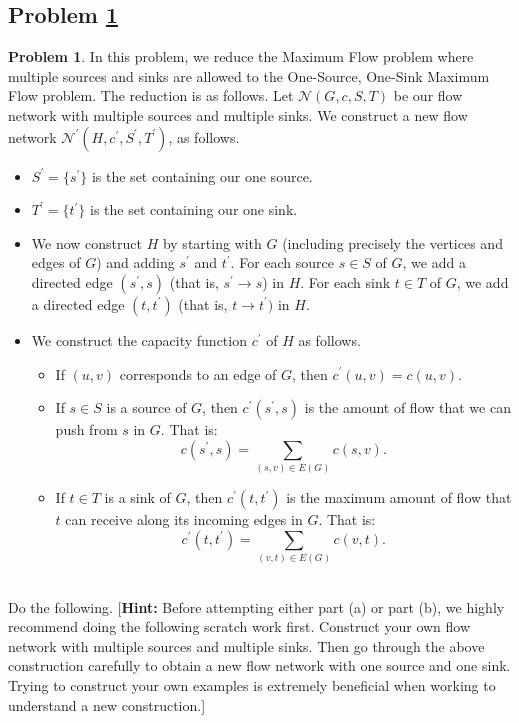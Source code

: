 \documentclass[11pt]{article}
\theoremstyle{definition}
\theoremstyle{definition}
\newtheorem{required}{Problem}
\theoremstyle{definition}
\begin{document}
\subsection{Problem \ref{S11Problem3}}
\begin{required} \label{S11Problem3}
In this problem, we reduce the \textsf{Maximum Flow} problem where multiple sources and sinks are allowed to the \textsf{One-Source, One-Sink Maximum Flow} problem. The reduction is as follows. Let $\mathcal{N}(G, c, S, T)$ be our flow network with multiple sources and multiple sinks. We construct a new flow network $\mathcal{N}^{\prime}(H, c^{\prime}, S^{\prime}, T^{\prime})$, as follows.
\begin{itemize}
\item $S^{\prime} = \{s^{\prime}\}$ is the set containing our one source.

\item $T^{\prime} = \{ t^{\prime}\}$ is the set containing our one sink.

\item We now construct $H$ by starting with $G$ (including precisely the vertices and edges of $G$) and adding $s^{\prime}$ and $t^{\prime}$. For each source $s \in S$ of $G$, we add a directed edge $(s^{\prime}, s)$ (that is, $s^{\prime} \to s$) in $H$. For each sink $t \in T$ of $G$, we add a directed edge $(t, t^{\prime})$ (that is, $t \to t^{\prime})$ in $H$.

\item We construct the capacity function $c^{\prime}$ of $H$ as follows.
\begin{itemize}
\item If $(u, v)$ corresponds to an edge of $G$, then $c^{\prime}(u, v) = c(u, v)$.
\item If $s \in S$ is a source of $G$, then $c^{\prime}(s^{\prime}, s)$ is the amount of flow that we can push from $s$ in $G$. That is:
\[
c(s^{\prime}, s) = \sum_{(s, v) \in E(G)} c(s, v).
\]

\item If $t \in T$ is a sink of $G$, then $c^{\prime}(t, t^{\prime})$ is the maximum amount of flow that $t$ can receive along its incoming edges in $G$. That is:
\[
c^{\prime}(t, t^{\prime}) = \sum_{(v, t) \in E(G)} c(v, t).
\]
\end{itemize}
\end{itemize}


\noindent \\ Do the following. [\textbf{Hint:} Before attempting either part (a) or part (b), we highly recommend doing the following scratch work first. Construct your own flow network with multiple sources and multiple sinks. Then go through the above construction carefully to obtain a new flow network with one source and one sink. Trying to construct your own examples is extremely beneficial when working to understand a new construction.]


\end{required}
\end{document}
